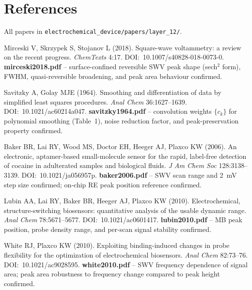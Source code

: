 \documentclass[10pt,a4paper]{article}
\numberwithin{equation}{section}
\begin{document}
\section*{References}

\noindent All papers in \texttt{electrochemical\_device/papers/layer\_12/}.

\begin{enumerate}[label={[\arabic*]},noitemsep,leftmargin=*]

\item Mirceski V, Skrzypek S, Stojanov L (2018). Square-wave voltammetry:
  a review on the recent progress. \textit{ChemTexts} 4:17.
  DOI:~10.1007/s40828-018-0073-0. \textbf{mirceski2018.pdf} -- surface-confined
  reversible SWV peak shape (sech$^2$ form), FWHM, quasi-reversible broadening,
  and peak area behaviour confirmed.

\item Savitzky A, Golay MJE (1964). Smoothing and differentiation of data
  by simplified least squares procedures. \textit{Anal Chem} 36:1627--1639.
  DOI:~10.1021/ac60214a047. \textbf{savitzky1964.pdf} -- convolution weights
  $\{c_k\}$ for polynomial smoothing (Table~1), noise reduction factor, and
  peak-preservation property confirmed.

\item Baker BR, Lai RY, Wood MS, Doctor EH, Heeger AJ, Plaxco KW (2006).
  An electronic, aptamer-based small-molecule sensor for the rapid,
  label-free detection of cocaine in adulterated samples and biological
  fluids. \textit{J Am Chem Soc} 128:3138--3139. DOI:~10.1021/ja056957p.
  \textbf{baker2006.pdf} -- SWV scan range and 2~mV step size confirmed;
  on-chip RE peak position reference confirmed.

\item Lubin AA, Lai RY, Baker BR, Heeger AJ, Plaxco KW (2010).
  Electrochemical, structure-switching biosensors: quantitative analysis
  of the usable dynamic range. \textit{Anal Chem} 78:5671--5677.
  DOI:~10.1021/ac0601417.
  \textbf{lubin2010.pdf} -- MB peak position, probe density range, and
  per-scan signal stability confirmed.

\item White RJ, Plaxco KW (2010). Exploiting binding-induced changes in
  probe flexibility for the optimization of electrochemical biosensors.
  \textit{Anal Chem} 82:73--76. DOI:~10.1021/ac9028595.
  \textbf{white2010.pdf} -- SWV frequency dependence of signal area;
  peak area robustness to frequency change compared to peak height
  confirmed.

\end{enumerate}
\end{document}
